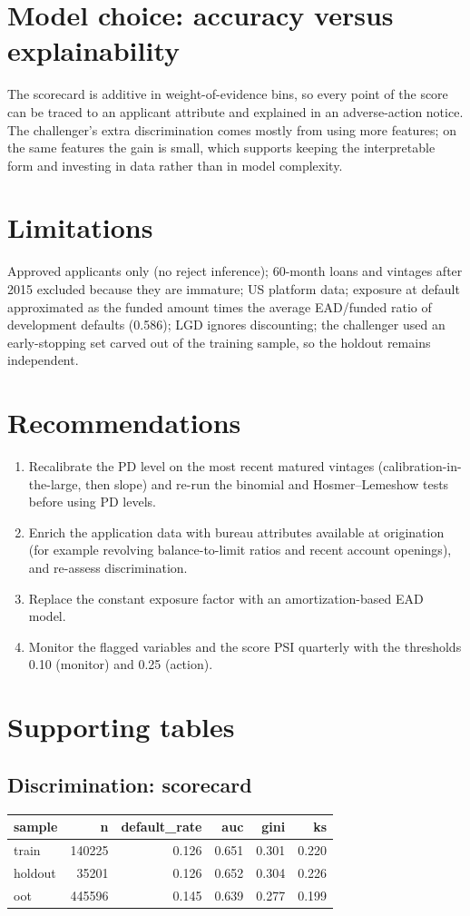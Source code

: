 \documentclass[11pt,a4paper]{article}
\begin{document}
\section*{Model choice: accuracy versus explainability}
The scorecard is additive in weight-of-evidence bins, so every point of the score can be traced to an
applicant attribute and explained in an adverse-action notice. The challenger's extra discrimination comes mostly from using more features; on the same features the gain is small, which supports keeping the interpretable form and investing in data rather than in model complexity.

\section*{Limitations}
Approved applicants only (no reject inference); 60-month loans and vintages after 2015 excluded because
they are immature; US platform data; exposure at default approximated as the funded amount times the average
EAD/funded ratio of development defaults (0.586); LGD ignores discounting; the challenger
used an early-stopping set carved out of the training sample, so the holdout remains independent.

\section*{Recommendations}
\begin{enumerate}
\item Recalibrate the PD level on the most recent matured vintages (calibration-in-the-large, then slope)
and re-run the binomial and Hosmer--Lemeshow tests before using PD levels.
\item Enrich the application data with bureau attributes available at origination (for example
revolving balance-to-limit ratios and recent account openings), and re-assess discrimination.
\item Replace the constant exposure factor with an amortization-based EAD model.
\item Monitor the flagged variables and the score PSI quarterly with the thresholds 0.10 (monitor) and
0.25 (action).
\end{enumerate}

\section*{Supporting tables}
\subsection*{Discrimination: scorecard}
\begin{tabular}{lrrrrr}
\toprule
sample & n & default\_rate & auc & gini & ks \\
\midrule
train & 140225 & 0.126 & 0.651 & 0.301 & 0.220 \\
holdout & 35201 & 0.126 & 0.652 & 0.304 & 0.226 \\
oot & 445596 & 0.145 & 0.639 & 0.277 & 0.199 \\
\bottomrule
\end{tabular}
\end{document}
